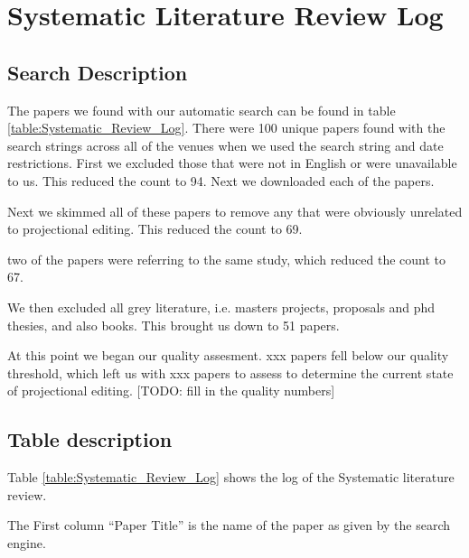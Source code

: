 \chapter{Systematic Literature Review Log} \label{Appendix:SLRLog}

\section{Search Description} 
The papers we found with our automatic search can be found in table \ref{table:Systematic_Review_Log}.
There were 100 unique papers found with the search strings across all of the venues when we used the search string and date restrictions.  
First we excluded those that were not in English or were unavailable to us.
This reduced the count to 94.
Next we downloaded each of the papers. 

Next we skimmed all of these papers to remove any that were obviously unrelated to projectional editing.
This reduced the count to 69.

two of the papers were referring to the same study, which reduced the count to 67.

We then excluded all grey literature, i.e. masters projects, proposals and phd thesies, and also books.
This brought us down to 51 papers.

At this point we began our quality assesment.
xxx papers fell below our quality threshold, which left us with xxx papers to assess to determine the current state of projectional editing.
[TODO: fill in the quality numbers]

\section{Table description}
Table \ref{table:Systematic_Review_Log} shows the log of the Systematic literature review.

The First column ``Paper Title'' is the name of the paper as given by the search engine.

